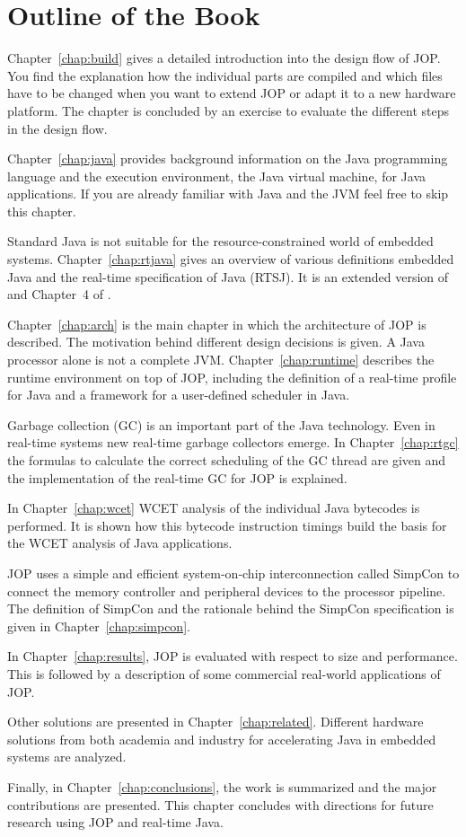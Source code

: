 \section{Outline of the Book}

Chapter~\ref{chap:build} gives a detailed introduction into the
design flow of JOP. You find the explanation how the individual
parts are compiled and which files have to be changed when you want
to extend JOP or adapt it to a new hardware platform. The chapter is
concluded by an exercise to evaluate the different steps in the
design flow.

Chapter~\ref{chap:java} provides background information on the Java
programming language and the execution environment, the Java virtual
machine, for Java applications. If you are already familiar with
Java and the JVM feel free to skip this chapter.

Standard Java is not suitable for the resource-constrained world of
embedded systems. Chapter~\ref{chap:rtjava} gives an overview of
various definitions embedded Java and the real-time specification of
Java (RTSJ). It is an extended version of \cite{jop:rtjava} and
Chapter~4 of \cite{jop:thesis}.

Chapter~\ref{chap:arch} is the main chapter in which the
architecture of JOP is described. The motivation behind different
design decisions is given. A Java processor alone is not a complete
JVM. Chapter~\ref{chap:runtime} describes the runtime environment on
top of JOP, including the definition of a real-time profile for Java
and a framework for a user-defined scheduler in Java.



Garbage collection (GC) is an important part of the Java technology.
Even in real-time systems new real-time garbage collectors emerge.
In Chapter~\ref{chap:rtgc} the formulas to calculate the correct
scheduling of the GC thread are given and the implementation of the
real-time GC for JOP is explained.

In Chapter~\ref{chap:wcet} WCET analysis of the individual Java
bytecodes is performed. It is shown how this bytecode instruction
timings build the basis for the WCET analysis of Java applications.

JOP uses a simple and efficient system-on-chip interconnection
called SimpCon to connect the memory controller and peripheral
devices to the processor pipeline. The definition of SimpCon and the
rationale behind the SimpCon specification is given in
Chapter~\ref{chap:simpcon}.


In Chapter~\ref{chap:results}, JOP is evaluated with respect to size
and performance. This is followed by a description of some
commercial real-world applications of JOP.

Other solutions are presented in Chapter~\ref{chap:related}.
Different hardware solutions from both academia and industry for
accelerating Java in embedded systems are analyzed.

Finally, in Chapter~\ref{chap:conclusions}, the work is summarized
and the major contributions are presented. This chapter concludes
with directions for future research using JOP and real-time Java.

